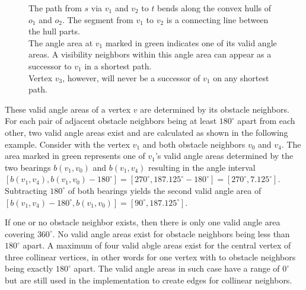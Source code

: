 \begin{figure}[h]
\begin{figcenter}
				\end{figcenter}
				\caption{
					The path from $s$ via $v_1$ and $v_2$ to $t$ bends along the convex hulls of $o_1$ and $o_2$.
					The segment from $v_1$ to $v_2$ is a connecting line between the hull parts.
					\\
					The angle area at $v_1$ marked in green indicates one of its valid angle areas.
					A visibility neighbors within this angle area can appear as a successor to $v_1$ in a shortest path.
					\\
					Vertex $v_3$, however, will never be a successor of $v_1$ on any shortest path.
				}
				\label{fig:convex-hull}
			\end{figure}
			
			These valid angle areas of a vertex $v$ are determined by its obstacle neighbors.
			For each pair of adjacent obstacle neighbors being at least $180^\circ$ apart from each other, two valid angle areas exist and are calculated as shown in the following example.
			Consider  with the vertex $v_1$ and both obstacle neighbors $v_0$ and $v_4$.
			The area marked in green represents one of $v_1$'s valid angle areas determined by the two bearings $b(v_1, v_0)$ and $b(v_1, v_4)$ resulting in the angle interval $[b(v_1, v_4), b(v_1, v_0) - 180^\circ] = [270^\circ, 187.125^\circ - 180^\circ] = [270^\circ, 7.125^\circ]$.
			Subtracting $180^\circ$ of both bearings yields the second valid angle area of $[b(v_1, v_4) - 180^\circ, b(v_1, v_0)] = [90^\circ, 187.125^\circ]$.
			
			If one or no obstacle neighbor exists, then there is only one valid angle area covering $360^\circ$.
			No valid angle areas exist for obstacle neighbors being less than $180^\circ$ apart.
			A maximum of four valid abgle areas exist for the central vertex of three collinear vertices, in other words for one vertex with to obstacle neighbors being exactly $180^\circ$ apart.
			The valid angle areas in such case have a range of $0^\circ$ but are still used in the implementation to create edges for collinear neighbors.
			

